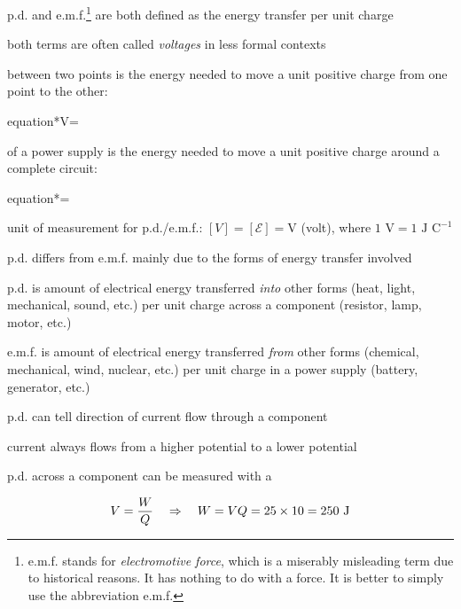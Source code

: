 p.d. and e.m.f.\footnote{e.m.f. stands for \emph{electromotive force}, which is a miserably misleading term due to historical reasons. It has nothing to do with a force. It is better to simply use the abbreviation e.m.f.} are both defined as the energy transfer per unit charge

both terms are often called \emph{voltages} in less formal contexts

\begin{ilight}
	 between two points is the energy needed to move a unit positive charge from one point to the other: \begin{empheq}[box=\tcbhighmath]{equation*}{V=}\end{empheq} 
\end{ilight}

\begin{ilight}
	 of a power supply is the energy needed to move a unit positive charge around a complete circuit: \begin{empheq}[box=\tcbhighmath]{equation*}{=} \end{empheq}
\end{ilight}


\cmt unit of measurement for p.d./e.m.f.: $[V] = [\mathcal{E}] = \text{V}$ (volt), where $1 \text{ V} = 1 \text{ J C}^{-1}$

\cmt p.d. differs from e.m.f. mainly due to the forms of energy transfer involved

p.d. is amount of electrical energy transferred \emph{into} other forms (heat, light, mechanical, sound, etc.) per unit charge across a component (resistor, lamp, motor, etc.)

e.m.f. is amount of electrical energy transferred \emph{from} other forms (chemical, mechanical, wind, nuclear, etc.) per unit charge in a power supply (battery, generator, etc.)

\cmt p.d. can tell direction of current flow through a component

current always flows from a higher potential to a lower potential

\cmt p.d. across a component can be measured with a 



\begin{soln}\begin{equation*}
	V = \frac{W}{Q} \quad \Rightarrow \quad W = V Q = 25 \times 10 = 250 \text{ J} 
\end{equation*}
\end{soln}

